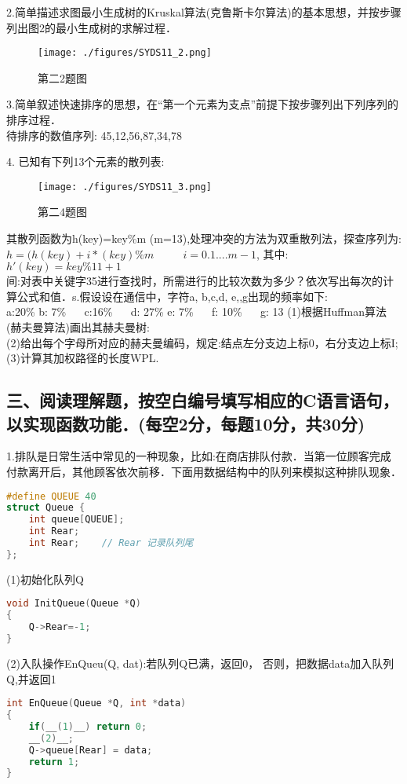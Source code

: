 2.简单描述求图最小生成树的Kruskal算法(克鲁斯卡尔算法)的基本思想，并按步骤列出图2的最小生成树的求解过程．
\begin{figure}[ht]
\centering
\texttt{[image: ./figures/SYDS11\_2.png]}
\caption{第二2题图} \label{SYDS11_fig2}
\end{figure}

3.简单叙述快速排序的思想，在“第一个元素为支点”前提下按步骤列出下列序列的排序过程． \\
待排序的数值序列: 45,12,56,87,34,78


4. 已知有下列13个元素的散列表:
\begin{figure}[ht]
\centering
\texttt{[image: ./figures/SYDS11\_3.png]}
\caption{第二4题图} \label{SYDS11_fig3}
\end{figure}
其散列函数为h(key)=key\%m (m=13),处理冲突的方法为双重散列法，探查序列为: \\
$h=(h(key)+i*(key)\%m$  $\qquad$ $i=0.1.... m-1$, 其中:$h'(key)=key\%11+1$ \\
间:对表中关键字35进行查找时，所需进行的比较次数为多少？依次写出每次的计算公式和值．s.假设设在通信中，字符a, b,c,d, e,,g出现的频率如下: \\
a:20\% b: 7\% $\quad$ c:16\% $\quad$ d: 27\% e: 7\% $\quad$ f: 10\% $\quad$ g: 13%
(1)根据Huffman算法(赫夫曼算法)画出其赫夫曼树: \\
(2)给出每个字母所对应的赫夫曼编码，规定:结点左分支边上标0，右分支边上标I;  \\
(3)计算其加权路径的长度WPL.

\subsection{三、阅读理解题，按空白编号填写相应的C语言语句，以实现函数功能．(每空2分，每题10分，共30分)}

1.排队是日常生活中常见的一种现象，比如:在商店排队付款．当第一位顾客完成付款离开后，其他顾客依次前移．下面用数据结构中的队列来模拟这种排队现象．
\begin{lstlisting}[language=cpp]
#define QUEUE 40
struct Queue {
    int queue[QUEUE];
    int Rear;
    int Rear;    // Rear 记录队列尾
};
\end{lstlisting}
(1)初始化队列Q
\begin{lstlisting}[language=cpp]
void InitQueue(Queue *Q)
{
    Q->Rear=-1;
}
\end{lstlisting}

(2)入队操作EnQueu(Q, dat):若队列Q已满，返回0， 否则，把数据data加入队列Q,并返回1
\begin{lstlisting}[language=cpp]
int EnQueue(Queue *Q, int *data)
{
    if(__(1)__) return 0;
    __(2)__;
    Q->queue[Rear] = data;
    return 1;
}
\end{lstlisting}


